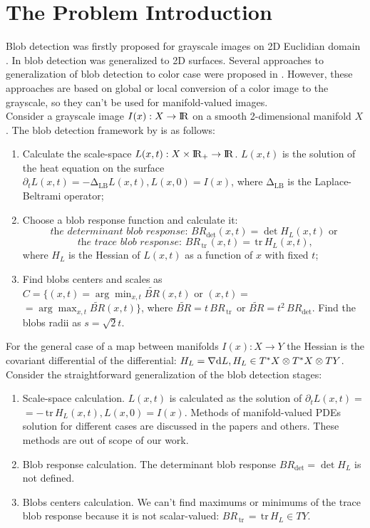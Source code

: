\documentclass{llncs}
\newcommand{\LaplaceBeltrami}{\mathrm{\Delta_{{LB}}}}
\newcommand{\partderiv}[2]{\partial_{#2} {#1}}
\newcommand{\toreal}{\rightarrow\bbbr}
\newcommand{\CovariantDiff}{\nabla}
\newcommand{\Diff}{\mathrm{d}}
\newcommand{\TangentBundle}[1]{T{#1}}
\newcommand{\CotangentBundle}[1]{\tensor*{T}{^{*}}{#1}}
\newcommand {\tr}{{\,}\mathrm{tr}{\,}}
\begin{document}
\section{The Problem Introduction}
Blob detection was firstly proposed for grayscale images on 2D Euclidian domain \cite{blob}. In \cite{ScalarBlob3D} blob detection was generalized to 2D surfaces. Several approaches to generalization of blob detection to color case were proposed in \cite{ColorBlob,GROM}. However, these approaches are based on global or local conversion of a color image to the grayscale, so they can't be used for manifold-valued images.
\\
Consider a grayscale image $I(x):X \toreal$ on a smooth 2-dimensional manifold $X$. The blob detection framework by \cite{ScalarBlob3D} is as follows:
\begin{enumerate} 
\item Calculate the scale-space $L(x,t):X\times \bbbr_{+} \toreal$. $L(x,t)$ is the solution of the heat equation on the surface
  $\partderiv{L(x, t)}{t}=-\LaplaceBeltrami{ L(x, t)},L(x, 0)=I(x)$, where $\LaplaceBeltrami$ is the Laplace-Beltrami operator;
\item Choose a blob response function and calculate it: 
\begin{equation} \textit{ the determinant blob response: } BR_{\det}(x, t)=\det{H_L(x,t)}\textrm{  or } \label{blob_det}\end{equation} 
\begin{equation} \textit{ the trace blob response: } BR_{\tr}(x, t)=\tr {H_L(x,t)}, \label{blob_tr}											\end{equation} 
 where $H_L$ is the Hessian of $L(x, t)$ as a function of $x$ with fixed $t$;
\item Find blobs centers and scales as $C=\{(x, t)=\arg \min_{x,t} \tilde{BR}(x, t)\textrm{  or } (x, t)=$
$=\arg \max_{x,t}\tilde{BR}(x, t)\}$, where 
$\tilde{BR}=t\,BR_{\tr}$ or $\tilde{BR}=t^2\,BR_{\det}$. Find the blobs radii as $s=\sqrt{2} t$.
\end{enumerate}

For the general case of a map between manifolds $I(x):X \to Y$ the Hessian is the covariant differential of the differential: $H_L=\CovariantDiff \Diff L,H_L \in \CotangentBundle{X}\otimes\CotangentBundle{X}\otimes\TangentBundle{Y}$. Consider the straightforward generalization of the blob detection stages:
\begin{enumerate}
\item Scale-space calculation. $L(x,t)$ is calculated as the solution of $\partderiv{L(x, t)}{t}=$ $=-\tr H_L(x, t), L(x, 0)=I(x)$. Methods of manifold-valued PDEs solution for different cases are discussed in the papers \cite{Harmonic,Kimmel,DTI} and others. These methods are out of scope of our work.
\item Blob response calculation. The determinant blob response $BR_{\det}=\det H_L$ is not defined. 
\item Blobs centers calculation. We can't find maximums or minimums of the trace blob response because it is not scalar-valued: $BR_{\tr}=\tr{H_L} \in TY$.
\end{enumerate} 
\end{document}
